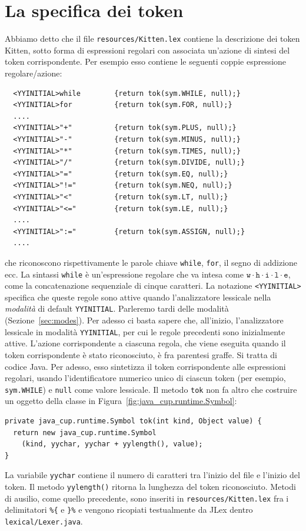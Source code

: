 \section{La specifica dei token}\label{sec:token_specification}
%
Abbiamo detto che il file \texttt{resources/Kitten.lex} contiene la
descrizione dei token Kitten, sotto forma di espressioni regolari con
associata un'azione di
sintesi del token corrispondente. Per esempio esso contiene le
seguenti coppie espressione regolare/azione:
%
\begin{verbatim}
  <YYINITIAL>while        {return tok(sym.WHILE, null);}
  <YYINITIAL>for          {return tok(sym.FOR, null);}
  ....
  <YYINITIAL>"+"          {return tok(sym.PLUS, null);}
  <YYINITIAL>"-"          {return tok(sym.MINUS, null);}
  <YYINITIAL>"*"          {return tok(sym.TIMES, null);}
  <YYINITIAL>"/"          {return tok(sym.DIVIDE, null);}
  <YYINITIAL>"="          {return tok(sym.EQ, null);}
  <YYINITIAL>"!="         {return tok(sym.NEQ, null);}
  <YYINITIAL>"<"          {return tok(sym.LT, null);}
  <YYINITIAL>"<="         {return tok(sym.LE, null);}
  ....
  <YYINITIAL>":="         {return tok(sym.ASSIGN, null);}
  ....
\end{verbatim}
%
che riconoscono rispettivamente
le parole chiave \texttt{while}, \texttt{for}, il segno di addizione ecc.
La sintassi \texttt{while} \`e un'espressione regolare che va intesa
come $\mathtt{w}\cdot\mathtt{h}\cdot\mathtt{i}\cdot\mathtt{l}\cdot\mathtt{e}$,
\cioe come la concatenazione sequenziale di cinque caratteri. La notazione
\texttt{<YYINITIAL>} specifica che queste regole sono attive quando
l'analizzatore lessicale \e nella \emph{modalit\`a} di default
\texttt{YYINITIAL}.
Parleremo \piu tardi delle modalit\`a (Sezione~\ref{sec:modes}).
Per adesso ci basta sapere che, all'inizio, l'analizzatore lessicale \e
in modalit\`a \texttt{YYINITIAL}, per cui le regole precedenti sono inizialmente attive.
L'azione corrispondente a ciascuna regola, che viene eseguita quando
il token corrispondente \`e stato riconosciuto, \`e fra parentesi graffe.
Si tratta di codice Java. Per adesso, esso sintetizza il token
corrispondente alle espressioni regolari, usando l'identificatore
numerico unico di ciascun token
(per esempio, \texttt{sym.WHILE}) e \texttt{null} come valore
lessicale. Il metodo \texttt{tok} non fa altro che costruire un oggetto
della classe in Figura~\ref{fig:java_cup.runtime.Symbol}:
%
\begin{verbatim}
private java_cup.runtime.Symbol tok(int kind, Object value) {
  return new java_cup.runtime.Symbol
    (kind, yychar, yychar + yylength(), value);
}
\end{verbatim}
%
La variabile \texttt{yychar} contiene il numero di caratteri tra l'inizio del
file e l'inizio del token. Il metodo \texttt{yylength()} ritorna
la lunghezza del token riconosciuto.
Metodi di ausilio, come quello precedente, sono inseriti in
\texttt{resources/Kitten.lex} fra i delimitatori \verb!%{! e
\verb!}%! e vengono ricopiati testualmente da JLex dentro
\texttt{lexical/Lexer.java}.

